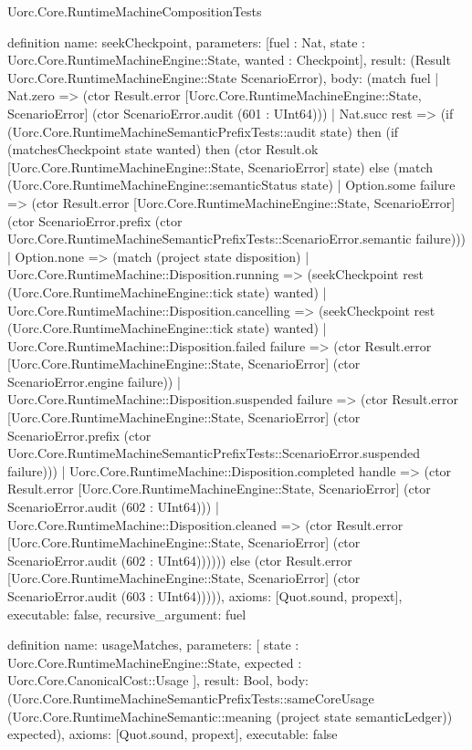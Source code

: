 \begin{lexlean}{Uorc.Core.RuntimeMachineCompositionTests}
\begin{semanticmodule}
definition{
  name: seekCheckpoint,
  parameters: [fuel : Nat, state : Uorc.Core.RuntimeMachineEngine::State, wanted : Checkpoint],
  result: (Result Uorc.Core.RuntimeMachineEngine::State ScenarioError),
  body: (match fuel
    | Nat.zero => (ctor Result.error [Uorc.Core.RuntimeMachineEngine::State, ScenarioError] (ctor ScenarioError.audit (601 : UInt64)))
    | Nat.succ rest => (if (Uorc.Core.RuntimeMachineSemanticPrefixTests::audit state) then (if (matchesCheckpoint state wanted) then (ctor Result.ok [Uorc.Core.RuntimeMachineEngine::State, ScenarioError] state) else (match (Uorc.Core.RuntimeMachineEngine::semanticStatus state)
      | Option.some failure => (ctor Result.error [Uorc.Core.RuntimeMachineEngine::State, ScenarioError] (ctor ScenarioError.prefix (ctor Uorc.Core.RuntimeMachineSemanticPrefixTests::ScenarioError.semantic failure)))
      | Option.none => (match (project state disposition)
        | Uorc.Core.RuntimeMachine::Disposition.running => (seekCheckpoint rest (Uorc.Core.RuntimeMachineEngine::tick state) wanted)
        | Uorc.Core.RuntimeMachine::Disposition.cancelling => (seekCheckpoint rest (Uorc.Core.RuntimeMachineEngine::tick state) wanted)
        | Uorc.Core.RuntimeMachine::Disposition.failed failure => (ctor Result.error [Uorc.Core.RuntimeMachineEngine::State, ScenarioError] (ctor ScenarioError.engine failure))
        | Uorc.Core.RuntimeMachine::Disposition.suspended failure => (ctor Result.error [Uorc.Core.RuntimeMachineEngine::State, ScenarioError] (ctor ScenarioError.prefix (ctor Uorc.Core.RuntimeMachineSemanticPrefixTests::ScenarioError.suspended failure)))
        | Uorc.Core.RuntimeMachine::Disposition.completed handle => (ctor Result.error [Uorc.Core.RuntimeMachineEngine::State, ScenarioError] (ctor ScenarioError.audit (602 : UInt64)))
        | Uorc.Core.RuntimeMachine::Disposition.cleaned => (ctor Result.error [Uorc.Core.RuntimeMachineEngine::State, ScenarioError] (ctor ScenarioError.audit (602 : UInt64)))))) else (ctor Result.error [Uorc.Core.RuntimeMachineEngine::State, ScenarioError] (ctor ScenarioError.audit (603 : UInt64))))),
  axioms: [Quot.sound, propext],
  executable: false,
  recursive_argument: fuel
}

definition{
  name: usageMatches,
  parameters: [
    state : Uorc.Core.RuntimeMachineEngine::State,
    expected : Uorc.Core.CanonicalCost::Usage
  ],
  result: Bool,
  body: (Uorc.Core.RuntimeMachineSemanticPrefixTests::sameCoreUsage (Uorc.Core.RuntimeMachineSemantic::meaning (project state semanticLedger)) expected),
  axioms: [Quot.sound, propext],
  executable: false
}


\end{semanticmodule}
\end{lexlean}
